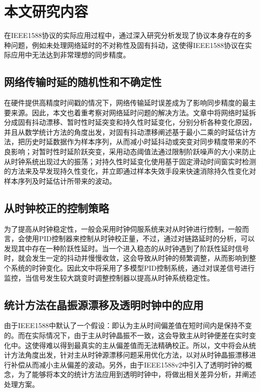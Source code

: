 \section{本文研究内容}
在IEEE1588协议的实际应用过程中，通过深入研究分析发现了协议本身存在的多种问题，例如未处理网络延时的不对称性及固有抖动，这使得IEEE1588协议在实际应用中无法达到非常理想的同步精度。

\subsection{网络传输时延的随机性和不确定性}
在硬件提供高精度时间戳的情况下，网络传输延时误差成为了影响同步精度的最主要来源。因此，本文也着重考察对网络延时问题的解决方法。文章中将网络时延拆分成固有抖动漂移、暂时性时延突变和持久性时延变化，分别分析各种变化原因，并且从数学统计方法的角度出发，对固有抖动漂移阐述基于最小二乘的时延估计方法，把历史时延数据作为样本序列，从而减小时延抖动或突变对同步精度带来的不良影响；对暂时性时延阶跃突变，采用动态阈值法通过限制阶跃噪声的大小来防止从时钟系统出现过大的振荡；对持久性时延变化使用基于固定滑动时间窗实时检测的方法来及早发现持久性变化，并立即通过样本失效手段来快速消除持久性变化对样本序列及时延估计所带来的波动。

\subsection{从时钟校正的控制策略}
为了提高从时钟稳定性，一般会采用时钟伺服系统来对从时钟进行控制，一般而言，会使用PID控制器来控制从时钟校正量，不过，通过对链路延时的分析，可以发现其中存在一种阶跃性延时。当一个进入稳态的从时钟遇到了阶跃性延时信号时，就会发生一定的抖动并慢慢收敛，这会导致从时钟的频繁调整，从而影响到整个系统的时钟变化\supercite{10,11}。因此文中将采用了多模型PID控制系统，通过对误差信号进行监控，当信号发生较大跳变时调整控制器以提高从时钟系统稳定性。

\subsection{统计方法在晶振源漂移及透明时钟中的应用}
由于IEEE1588中默认了一个假设：即认为主从时间偏差值在短时间内是保持不变的。而在实际情况下，由于主从时钟晶振不一致，这会导致主从时钟便差在实时变化中。这使得难以得到最真实的主从偏差值而无法精确校正。所以，文中将会从统计方法角度出发，针对主从时钟源漂移问题采用优化方法，以对从时钟晶振漂移进行补偿从而减小主从偏差的波动。另外，由于IEEE1588v2中引入了透明时钟的概念，为了能够将本文的统计方法应用到透明时钟中，将做出相关差异分析，并阐述处理方案。

